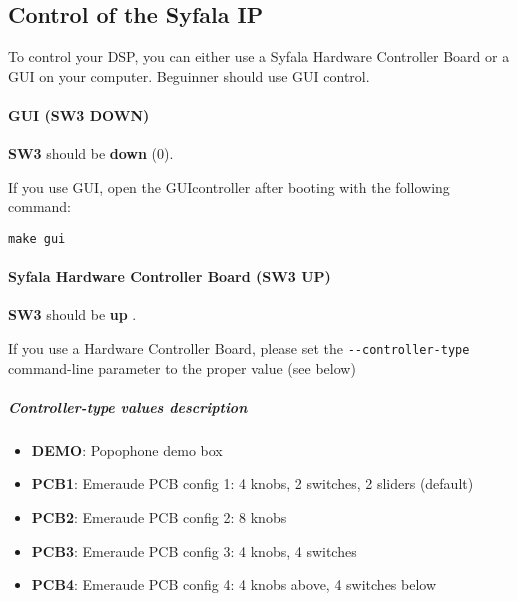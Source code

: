 \subsection{Control of the Syfala IP}
\label{control}

To control your DSP, you can either use a Syfala Hardware Controller Board or a
GUI on your computer. Beguinner should use GUI control.

\hypertarget{gui-sw3-down}{%
\paragraph{GUI (SW3 DOWN)}\label{gui-sw3-down}}

\textbf{SW3} should be \textbf{down} (0).

If you use GUI, open the GUIcontroller after booting with the following
command:

\begin{verbatim}
make gui
\end{verbatim}

\hypertarget{syfala-hardware-controller-board-sw3-up}{%
\paragraph{Syfala Hardware Controller Board (SW3
UP)}\label{syfala-hardware-controller-board-sw3-up}}

\textbf{SW3} should be \textbf{up} .

If you use a Hardware Controller Board, please set the
\texttt{-\/-controller-type} command-line parameter to the proper value
(see below)

\hypertarget{controller-type-values-description}{%
\subparagraph{Controller-type values
description}\label{controller-type-values-description}}

\begin{itemize}

\item
  \textbf{DEMO}: Popophone demo box
\item
  \textbf{PCB1}: Emeraude PCB config 1: 4 knobs, 2 switches, 2 sliders
  (default)
\item
  \textbf{PCB2}: Emeraude PCB config 2: 8 knobs
\item
  \textbf{PCB3}: Emeraude PCB config 3: 4 knobs, 4 switches
\item
  \textbf{PCB4}: Emeraude PCB config 4: 4 knobs above, 4 switches below
\end{itemize}

